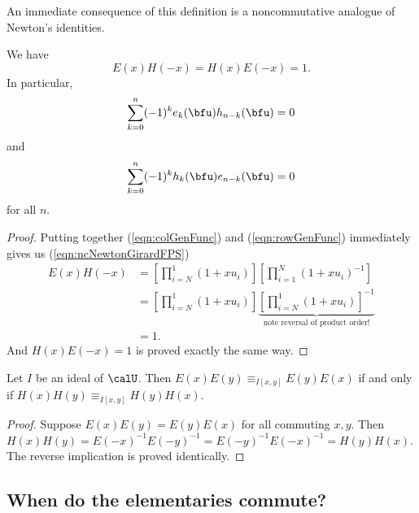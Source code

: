 \documentclass{article}
\begin{document}
An immediate consequence of this definition is a noncommutative analogue of Newton's identities.

\begin{proposition}
    We have
    \begin{equation}
        \label{eqn:ncNewtonGirardFPS}
        E(x)H(-x) = H(x)E(-x) = 1.
    \end{equation}
    In particular,
    \[
        \sum_{k=0}^n (-1)^ke_k(\bfu)h_{n-k}(\bfu) = 0
    \]
    and
    \[
        \sum_{k=0}^n (-1)^kh_k(\bfu)e_{n-k}(\bfu) = 0
    \]
    for all $n$.
\end{proposition}

\begin{proof}
    Putting together (\ref{eqn:colGenFunc}) and (\ref{eqn:rowGenFunc}) immediately gives us (\ref{eqn:ncNewtonGirardFPS})
    \begin{align*}
        E(x)H(-x)
        &=
        \left[
            \prod_{i=N}^1
            (1+xu_i)
        \right]
        \left[
            \prod_{i=1}^N
            (1+xu_i)^{-1}
        \right]
        \\
        &=
        \left[
            \prod_{i=N}^1
            (1+xu_i)
        \right]
        \underbrace{
            \left[
                \prod_{i=N}^1
                (1+xu_i)
            \right]^{-1}
        }_{\text{note reversal of product order!}}
        \\
        &=
        1.
    \end{align*}
    And $H(x)E(-x)=1$ is proved exactly the same way.
\end{proof}


\begin{corollary}
    \label{corr:ECommutesIffHCommutes}
    Let $I$ be an ideal of $\calU$.
    Then $E(x)E(y) \equiv_{I[x,y]} E(y)E(x)$ if and only if $H(x)H(y) \equiv_{I[x,y]} H(y)H(x)$.
\end{corollary}

\begin{proof}
    Suppose $E(x)E(y) = E(y)E(x)$ for all commuting $x,y$.
    Then $H(x)H(y) = E(-x)^{-1}E(-y)^{-1} = E(-y)^{-1}E(-x)^{-1} = H(y)H(x)$.
    The reverse implication is proved identically.
\end{proof}

\subsection{
    When do the elementaries commute?
}
\end{document}
